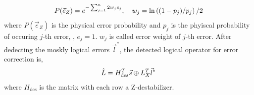 \begin{equation}\small
P(\vec{e}_Z) = e^{-\sum_{j=1}^n 2w_j e_j}, \quad w_j = \ln \left( (1 - p_j)/p_j \right) /2 \label{eq:errorrate}
\end{equation}
where \( P(\vec{e}_Z)  \) is the physical error probability and $p_j$ is the phyiscal probability of occuring $j$-th error, \ie, $e_j=1$. $w_j$ is called error weight of $j$-th error.
After dedecting the moskly logical errors $\vec{l}^*$, the detected logical operator for error correction is,
\begin{equation} \small
    \hat{L} = H_{\text{des}}^T \vec{s} \oplus L_X^T \vec{l}^* \label{eq:recovererror}
\end{equation}
where $H_{\text{des}}$ is the matrix with each row a Z-destabilizer. 





